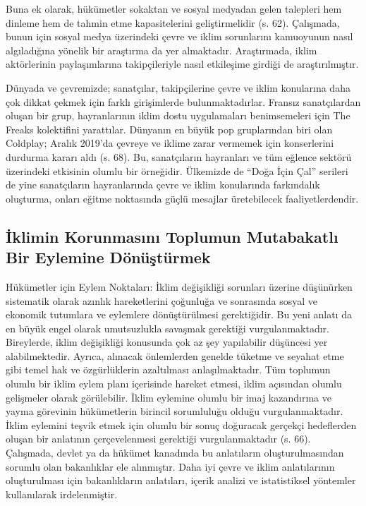 \documentclass[
]{book}
\begin{document}
Buna ek olarak, hükümetler sokaktan ve sosyal medyadan gelen talepleri hem dinleme hem de tahmin etme kapasitelerini geliştirmelidir (s. 62). \citep{ponthieu2019climate} Çalışmada, bunun için sosyal medya üzerindeki çevre ve iklim sorunlarını kamuoyunun nasıl algıladığına yönelik bir araştırma da yer almaktadır. Araştırmada, iklim aktörlerinin paylaşımlarına takipçileriyle nasıl etkileşime girdiği de araştırılmıştır.

Dünyada ve çevremizde; sanatçılar, takipçilerine çevre ve iklim konularına daha çok dikkat çekmek için farklı girişimlerde bulunmaktadırlar. Fransız sanatçılardan oluşan bir grup, hayranlarının iklim dostu uygulamaları benimsemeleri için The Freaks kolektifini yarattılar. Dünyanın en büyük pop gruplarından biri olan Coldplay; Aralık 2019'da çevreye ve iklime zarar vermemek için konserlerini durdurma kararı aldı (s. 68). \citep{ponthieu2019climate} Bu, sanatçıların hayranları ve tüm eğlence sektörü üzerindeki etkisinin olumlu bir örneğidir. Ülkemizde de ``Doğa İçin Çal'' serileri de yine sanatçıların hayranlarında çevre ve iklim konularında farkındalık oluşturma, onları eğitme noktasında güçlü mesajlar üretebilecek faaliyetlerdendir.

\hypertarget{iklimin-korunmasux131nux131-toplumun-mutabakatlux131-bir-eylemine-duxf6nuxfcux15ftuxfcrmek}{%
\subsection{İklimin Korunmasını Toplumun Mutabakatlı Bir Eylemine Dönüştürmek}\label{iklimin-korunmasux131nux131-toplumun-mutabakatlux131-bir-eylemine-duxf6nuxfcux15ftuxfcrmek}}

Hükümetler için Eylem Noktaları: İklim değişikliği sorunları üzerine düşünürken sistematik olarak azınlık hareketlerini çoğunluğa ve sonrasında sosyal ve ekonomik tutumlara ve eylemlere dönüştürülmesi gerektiğidir. Bu yeni anlatı da en büyük engel olarak umutsuzlukla savaşmak gerektiği vurgulanmaktadır. Bireylerde, iklim değişikliği konusunda çok az şey yapılabilir düşüncesi yer alabilmektedir. Ayrıca, alınacak önlemlerden genelde tüketme ve seyahat etme gibi temel hak ve özgürlüklerin azaltılması anlaşılmaktadır. Tüm toplumun olumlu bir iklim eylem planı içerisinde hareket etmesi, iklim açısından olumlu gelişmeler olarak görülebilir. İklim eylemine olumlu bir imaj kazandırma ve yayma görevinin hükümetlerin birincil sorumluluğu olduğu vurgulanmaktadır. İklim eylemini teşvik etmek için olumlu bir sonuç doğuracak gerçekçi hedeflerden oluşan bir anlatının çerçevelenmesi gerektiği vurgulanmaktadır (s. 66).\citep{ponthieu2019climate} Çalışmada, devlet ya da hükümet kanadında bu anlatıların oluşturulmasından sorumlu olan bakanlıklar ele alınmıştır. Daha iyi çevre ve iklim anlatılarının oluşturulması için bakanlıkların anlatıları, içerik analizi ve istatistiksel yöntemler kullanılarak irdelenmiştir.
\end{document}
